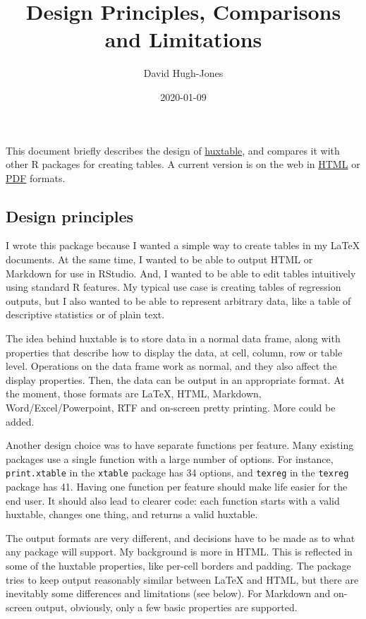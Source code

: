 \documentclass[]{article}
\title{Design Principles, Comparisons and Limitations}
\author{David Hugh-Jones}
\date{2020-01-09}
\begin{document}
\maketitle

This document briefly describes the design of
\href{https://hughjonesd.github.io/huxtable}{huxtable}, and compares it
with other R packages for creating tables. A current version is on the
web in
\href{http://hughjonesd.github.io/huxtable/design-principles.html}{HTML}
or
\href{http://hughjonesd.github.io/huxtable/design-principles.pdf}{PDF}
formats.

\hypertarget{design-principles}{%
\subsection{Design principles}\label{design-principles}}

I wrote this package because I wanted a simple way to create tables in
my LaTeX documents. At the same time, I wanted to be able to output HTML
or Markdown for use in RStudio. And, I wanted to be able to edit tables
intuitively using standard R features. My typical use case is creating
tables of regression outputs, but I also wanted to be able to represent
arbitrary data, like a table of descriptive statistics or of plain text.

The idea behind huxtable is to store data in a normal data frame, along
with properties that describe how to display the data, at cell, column,
row or table level. Operations on the data frame work as normal, and
they also affect the display properties. Then, the data can be output in
an appropriate format. At the moment, those formats are LaTeX, HTML,
Markdown, Word/Excel/Powerpoint, RTF and on-screen pretty printing. More
could be added.

Another design choice was to have separate functions per feature. Many
existing packages use a single function with a large number of options.
For instance, \texttt{print.xtable} in the \texttt{xtable} package has
34 options, and \texttt{texreg} in the \texttt{texreg} package has 41.
Having one function per feature should make life easier for the end
user. It should also lead to clearer code: each function starts with a
valid huxtable, changes one thing, and returns a valid huxtable.

The output formats are very different, and decisions have to be made as
to what any package will support. My background is more in HTML. This is
reflected in some of the huxtable properties, like per-cell borders and
padding. The package tries to keep output reasonably similar between
LaTeX and HTML, but there are inevitably some differences and
limitations (see below). For Markdown and on-screen output, obviously,
only a few basic properties are supported.
\end{document}
